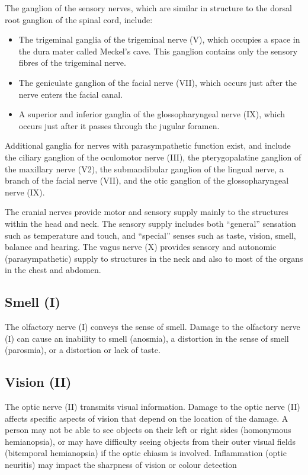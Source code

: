 The ganglion of the sensory nerves, which are similar in structure to the dorsal root ganglion of the spinal cord, include:

\begin{itemize}
\tightlist
\item
  The trigeminal ganglia of the trigeminal nerve (V), which occupies a space in the dura mater called Meckel's cave. This ganglion contains only the sensory fibres of the trigeminal nerve.
\item
  The geniculate ganglion of the facial nerve (VII), which occurs just after the nerve enters the facial canal.
\item
  A superior and inferior ganglia of the glossopharyngeal nerve (IX), which occurs just after it passes through the jugular foramen.
\end{itemize}

Additional ganglia for nerves with parasympathetic function exist, and include the ciliary ganglion of the oculomotor nerve (III), the pterygopalatine ganglion of the maxillary nerve (V2), the submandibular ganglion of the lingual nerve, a branch of the facial nerve (VII), and the otic ganglion of the glossopharyngeal nerve (IX).

The cranial nerves provide motor and sensory supply mainly to the structures within the head and neck. The sensory supply includes both ``general'' sensation such as temperature and touch, and ``special'' senses such as taste, vision, smell, balance and hearing. The vagus nerve (X) provides sensory and autonomic (parasympathetic) supply to structures in the neck and also to most of the organs in the chest and abdomen.

\hypertarget{smell-i}{%
\subsection{Smell (I)}\label{smell-i}}

The olfactory nerve (I) conveys the sense of smell. Damage to the olfactory nerve (I) can cause an inability to smell (anosmia), a distortion in the sense of smell (parosmia), or a distortion or lack of taste.

\hypertarget{vision-ii}{%
\subsection{Vision (II)}\label{vision-ii}}

The optic nerve (II) transmits visual information. Damage to the optic nerve (II) affects specific aspects of vision that depend on the location of the damage. A person may not be able to see objects on their left or right sides (homonymous hemianopsia), or may have difficulty seeing objects from their outer visual fields (bitemporal hemianopsia) if the optic chiasm is involved. Inflammation (optic neuritis) may impact the sharpness of vision or colour detection

